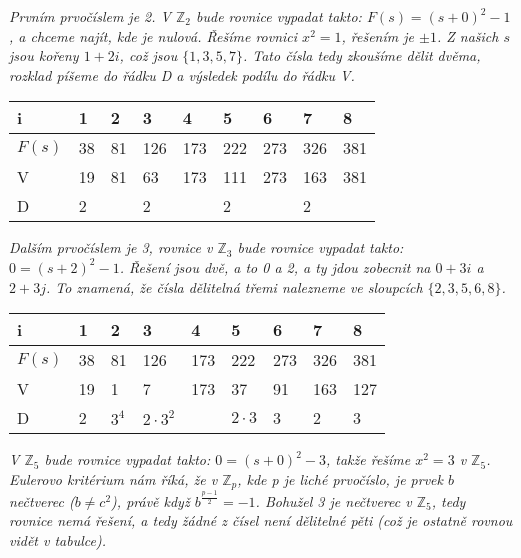 \documentclass[10pt,a4paper]{article}
\begin{document}
\textit{Prvním prvočíslem je 2. V $\mathbb{Z}_2$ bude rovnice vypadat takto: $F(s) = (s + 0)^2 - 1$, a chceme najít, kde je nulová. Řešíme rovnici $x^2 = 1$, řešením je $\pm1$. Z našich $s$ jsou kořeny $1 + 2i$, což jsou $\{1, 3, 5, 7\}$. Tato čísla tedy zkoušíme dělit dvěma, rozklad píšeme do řádku D a výsledek podílu do řádku V.}

\begin{table}[h!]
\centering
\begin{tabular}{|p{1cm}|p{1cm}|p{1cm}|p{1cm}|p{1cm}|p{1cm}|p{1cm}|p{1cm}|p{1cm}|}
\hline
i & \textbf{1} & 2 &\textbf{3} & 4 & \textbf{5} & 6 & \textbf{7} & 8\\
\hline
\hline
$F(s)$ & 38 & 81 & 126 & 173 & 222 & 273 & 326 & 381\\
\hline
V & 19 & 81 & 63 & 173 & 111 & 273 & 163 & 381\\
\hline
D & 2  &       & 2   &         & 2     &         &  2    &  \\
\hline
\end{tabular}
\end{table}

\textit{Dalším prvočíslem je 3, rovnice v $\mathbb{Z}_3$ bude rovnice vypadat takto: $0 = (s + 2)^2 - 1$. Řešení jsou dvě, a to 0 a 2, a ty jdou zobecnit na $0 + 3i$ a $2 + 3j$.  To znamená, že čísla dělitelná třemi nalezneme ve sloupcích $\{2, 3, 5, 6, 8\}$.}

\begin{table}[h!]
\centering
\begin{tabular}{|p{1cm}|p{1cm}|p{1cm}|p{1cm}|p{1cm}|p{1cm}|p{1cm}|p{1cm}|p{1cm}|}
\hline
i & 1 & \textbf{2} &\textbf{3} & 4 & \textbf{5} & \textbf{6} & 7 & \textbf{8}\\
\hline
\hline
$F(s)$ & 38 & 81 & 126 & 173 & 222 & 273 & 326 & 381\\
\hline
V & 19 & 1 & 7 & 173 & 37 & 91 & 163 & 127\\
\hline
D & 2  & $3^4$ & $2\cdot 3^2$  &         & $2\cdot 3$   &   3   &  2    &  3 \\
\hline
\end{tabular}
\end{table}

\textit{V $\mathbb{Z}_5$ bude rovnice vypadat takto: $0 = (s + 0)^2 - 3$, takže řešíme $x^2 = 3$ v $\mathbb{Z}_5$.  Eulerovo kritérium nám říká, že v $\mathbb{Z}_p$, kde p je liché prvočíslo, je prvek $b$ nečtverec ($b \neq c^2$), právě když $b^{\frac{p-1}{2}} = -1$. Bohužel 3 je nečtverec v $\mathbb{Z}_5$, tedy rovnice nemá řešení, a tedy žádné z čísel není dělitelné pěti (což je ostatně rovnou vidět v tabulce).}
\end{document}
